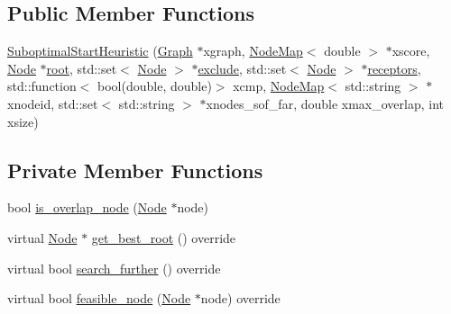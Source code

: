 \subsection*{Public Member Functions}
\begin{DoxyCompactItemize}
\item 
\hyperlink{classderegnet_1_1SuboptimalStartHeuristic_a3a05d150d544a21523f7babcf4910a45}{Suboptimal\+Start\+Heuristic} (\hyperlink{namespacederegnet_a55b76c55bbabc682cbc61f8b9948799e}{Graph} $\ast$xgraph, \hyperlink{namespacederegnet_ae102b707ae1d6f83c639ece5e0dd5658}{Node\+Map}$<$ double $>$ $\ast$xscore, \hyperlink{namespacederegnet_a744bad34f2de9856d36715a445f027f3}{Node} $\ast$\hyperlink{classderegnet_1_1DeregnetStartHeuristic_a4605d41352e3adf1f9f9f32466a4e61e}{root}, std\+::set$<$ \hyperlink{namespacederegnet_a744bad34f2de9856d36715a445f027f3}{Node} $>$ $\ast$\hyperlink{classderegnet_1_1DeregnetStartHeuristic_aa22c6581cd404bf7ac325850b28dc951}{exclude}, std\+::set$<$ \hyperlink{namespacederegnet_a744bad34f2de9856d36715a445f027f3}{Node} $>$ $\ast$\hyperlink{classderegnet_1_1DeregnetStartHeuristic_ab80c046ff2b7c64086fceb84987b3e50}{receptors}, std\+::function$<$ bool(double, double)$>$ xcmp, \hyperlink{namespacederegnet_ae102b707ae1d6f83c639ece5e0dd5658}{Node\+Map}$<$ std\+::string $>$ $\ast$xnodeid, std\+::set$<$ std\+::string $>$ $\ast$xnodes\+\_\+sof\+\_\+far, double xmax\+\_\+overlap, int xsize)
\end{DoxyCompactItemize}
\subsection*{Private Member Functions}
\begin{DoxyCompactItemize}
\item 
bool \hyperlink{classderegnet_1_1SuboptimalStartHeuristic_a911e7e3003bbf92b170a943e714b014e}{is\+\_\+overlap\+\_\+node} (\hyperlink{namespacederegnet_a744bad34f2de9856d36715a445f027f3}{Node} $\ast$node)
\item 
virtual \hyperlink{namespacederegnet_a744bad34f2de9856d36715a445f027f3}{Node} $\ast$ \hyperlink{classderegnet_1_1SuboptimalStartHeuristic_aaa8bad0a658a0e1de5e849a5fb58aa21}{get\+\_\+best\+\_\+root} () override
\item 
virtual bool \hyperlink{classderegnet_1_1SuboptimalStartHeuristic_afe38bb6e18c6fb1270537bab0d2a3158}{search\+\_\+further} () override
\item 
virtual bool \hyperlink{classderegnet_1_1SuboptimalStartHeuristic_acbd151d7620495d80be8c63f1d3c4ecb}{feasible\+\_\+node} (\hyperlink{namespacederegnet_a744bad34f2de9856d36715a445f027f3}{Node} $\ast$node) override
\end{DoxyCompactItemize}
